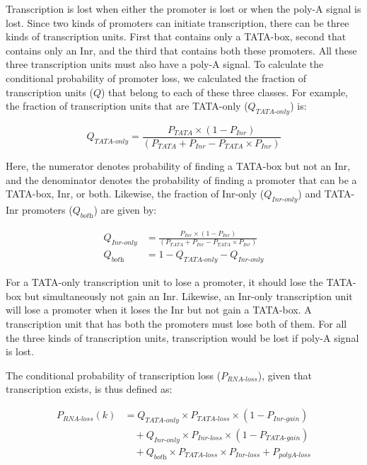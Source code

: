 \documentclass[12pt,a4paper]{article}
\begin{document}
Transcription is lost when either the promoter is lost or when the poly-A signal is lost. Since two kinds of promoters can initiate transcription, there can be three kinds of transcription units. First that contains only a TATA-box, second that contains only an Inr, and the third that contains both these promoters. All these three transcription units must also have a poly-A signal. To calculate the conditional probability of promoter loss, we calculated the fraction of transcription units ($Q$) that belong to each of these three classes. For example, the fraction of transcription units that are TATA-only ($Q_\textit{TATA-only}$) is:

\begin{equation*}
Q_\textit{TATA-only} = \frac{P_\textit{TATA}\times(1 - P_\textit{Inr})}{(P_\textit{TATA} + P_\textit{Inr} - P_\textit{TATA}\times P_\textit{Inr})}
\end{equation*}

\vspace{1ex}

Here, the numerator denotes probability of finding a TATA-box but not an Inr, and the denominator denotes the probability of finding a promoter that can be a TATA-box, Inr, or both. Likewise, the fraction of Inr-only ($Q_\textit{Inr-only}$) and TATA-Inr promoters ($Q_\textit{both}$) are given by:

\begin{align*}
Q_\textit{Inr-only} & = \frac{P_\textit{Inr}\times(1 - P_\textit{Inr})}{(P_\textit{TATA} + P_\textit{Inr} - P_\textit{TATA}\times P_\textit{Inr})} \\[1ex]
Q_\textit{both} & = 1 - Q_\textit{TATA-only} -Q_\textit{Inr-only}
\end{align*}

For a TATA-only transcription unit to lose a promoter, it should lose the TATA-box but simultaneously not gain an Inr. Likewise, an Inr-only transcription unit will lose a promoter when it loses the Inr but not gain a TATA-box. A transcription unit that has both the promoters must lose both of them. For all the three kinds of transcription units, transcription would be lost if poly-A signal is lost.

The conditional probability of transcription loss ($P_\textit{RNA-loss}$), given that transcription exists, is thus defined as:

\begin{align}
P_\textit{RNA-loss}(k) & = Q_\textit{TATA-only} \times P_\textit{TATA-loss}\times(1-P_\textit{Inr-gain}) \nonumber\\[1pt]
 & \quad + Q_\textit{Inr-only}\times P_\textit{Inr-loss}\times(1-P_\textit{TATA-gain}) \nonumber \\[1pt]
 & \quad + Q_\textit{both}\times P_\textit{TATA-loss} \times P_\textit{Inr-loss} + P_\textit{polyA-loss}
\label{eqrnaloss}
\end{align}
\end{document}
